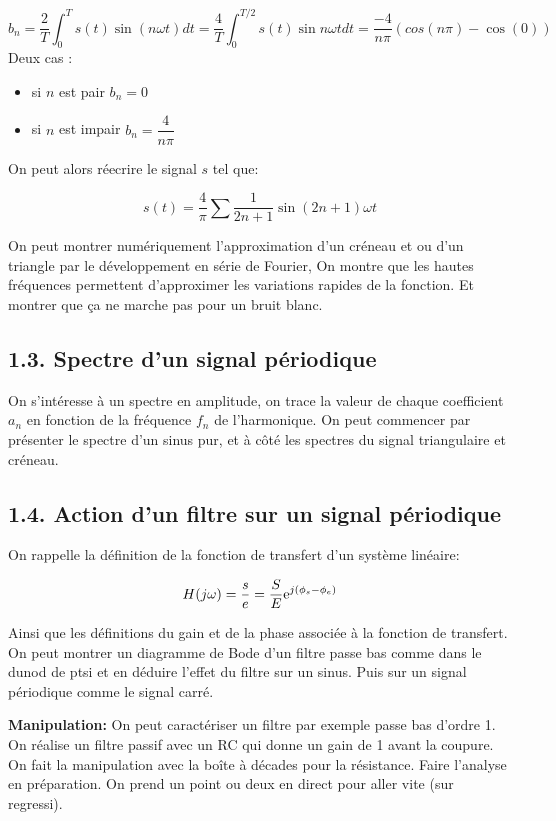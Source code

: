 \documentclass[french, a4paper, 10pt, twocolumn, landscape]{article}
\begin{document}
$$b_n = \dfrac{2}{T}\int_{0}^Ts(t)\sin(n\omega t)dt = \dfrac{4}{T}\int_{0}^{T/2}s(t)\sin{n\omega t}dt = \dfrac{-4}{n\pi}(cos(n\pi)-\cos(0))$$
Deux cas : 
\begin{itemize}
  \item si $n$ est pair $b_n=0$
  \item si $n$ est impair $b_n = \dfrac{4}{n\pi}$
\end{itemize}
On peut alors réecrire le signal $s$ tel que:

\begin{equation}
  s(t) = \dfrac{4}{\pi}\sum \dfrac{1}{2n+1}\sin{(2n+1)\omega t}
\end{equation}

On peut montrer numériquement l'approximation d'un créneau et ou d'un triangle par le développement en série de Fourier, On montre que les hautes fréquences permettent d'approximer les variations rapides de la fonction.  Et montrer que ça ne marche pas pour un bruit blanc.

\subsection*{1.3. Spectre d'un signal périodique}

On s'intéresse à un spectre en amplitude, on trace la valeur de chaque coefficient $a_n$ en fonction de la fréquence $f_n$ de l'harmonique. On peut commencer par présenter le spectre d'un sinus pur, et à côté les spectres du signal triangulaire et créneau.

\subsection*{1.4. Action d'un filtre sur un signal périodique}

On rappelle la définition de la fonction de transfert d'un système linéaire: 

\begin{equation}
  H(j\omega) = \dfrac{s}{e} = \dfrac{S}{E}{\rm e}^{j(\phi_s-\phi_e)}
\end{equation}

Ainsi que les définitions du gain et de la phase  associée à la fonction de transfert.  On peut montrer un diagramme de Bode d'un filtre passe bas comme dans le dunod de ptsi et en déduire l'effet du filtre sur un sinus. Puis sur un  signal périodique comme le signal carré.\medskip

\textbf{Manipulation:} On peut caractériser un filtre par exemple passe bas d'ordre 1. On réalise un filtre passif avec un RC qui donne un gain de 1 avant la coupure. On fait la manipulation avec la boîte à décades pour la résistance. Faire l'analyse en préparation. On prend un point ou deux en direct pour aller vite (sur regressi).\medskip
\end{document}
